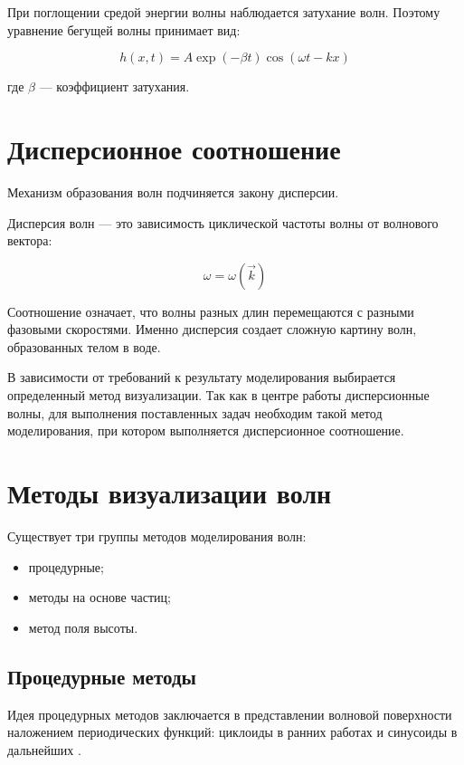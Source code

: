 При поглощении средой энергии волны наблюдается затухание волн. Поэтому уравнение бегущей волны принимает вид:

\begin{equation}
    \label{solution-wave-eq3}
    h(x,t) = A \exp(-\beta t) \cos (\omega t - kx)
\end{equation}

где $\beta$ --- коэффициент затухания.

\section{Дисперсионное соотношение}

Механизм образования волн подчиняется закону дисперсии.

Дисперсия волн --- это зависимость циклической частоты волны от волнового вектора:

\begin{equation}
    \label{dispersion}
    \omega = \omega (\vec{k})
\end{equation}

Соотношение означает, что волны разных длин перемещаются с разными фазовыми скоростями. Именно дисперсия создает сложную картину волн, образованных телом в воде.

В зависимости от требований к результату моделирования выбирается определенный метод визуализации. Так как в центре работы дисперсионные волны, для выполнения поставленных задач необходим такой метод моделирования, при котором выполняется дисперсионное соотношение.

\section{Методы визуализации волн}

Существует три группы методов моделирования волн:

\begin{itemize}
    \item процедурные;
    \item методы на основе частиц;
    \item метод поля высоты.
\end{itemize}

\subsection{Процедурные методы}

Идея процедурных методов заключается в представлении волновой поверхности наложением периодических функций: циклоиды в ранних работах \cite{cycloid} и синусоиды в дальнейших \cite{sin}. 

